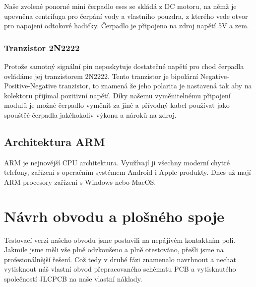 \documentclass[12pt,a4paper]{article}
\begin{document}
Naše zvolené ponorné mini čerpadlo eses se skládá z DC motoru, na němž je upevněna centrifuga pro čerpání vody a vlastního pouzdra, z kterého vede otvor pro napojení odtokové hadičky. Čerpadlo je připojeno na zdroj napětí 5V a zem.

\subsubsection{Tranzistor 2N2222}

Protože samotný signální pin neposkytuje dostatečné napětí pro chod čerpadla ovládáme jej tranzistorem 2N2222. Tento tranzistor je bipolární Negative-Positive-Negative tranzistor, to znamená že jeho polarita je nastavená tak aby na kolektoru přijímal pozitivní napětí. Díky našemu vyměnitelnému připojení modulů je možné čerpadlo vyměnit za jiné a přívodný kabel používat jako spouštěč čerpadla jakéhokoliv výkonu a nároků na zdroj.

\subsection{Architektura ARM}

\ac{ARM} je nejnovější \ac{CPU} architektura. Využívají ji všechny moderní chytré telefony, zařízení s operačním systémem Android i Apple produkty. Dnes už mají \ac{ARM} procesory zařízení s Windows nebo MacOS.


\clearpage

\section{Návrh obvodu a plošného spoje}

Testovací verzi našeho obvodu jsme postavili na nepájivém kontaktním poli. Jakmile jsme měli vše plně odzkoušeno a plně otestováno, přešli jsme na profesionálnější řešení. Což tedy v druhé fázi znamenalo navrhnout a nechat vytisknout náš vlastní obvod přepracovaného schématu \ac{PCB} a vytisknutého společností JLCPCB na naše vlastní náklady.
\end{document}
